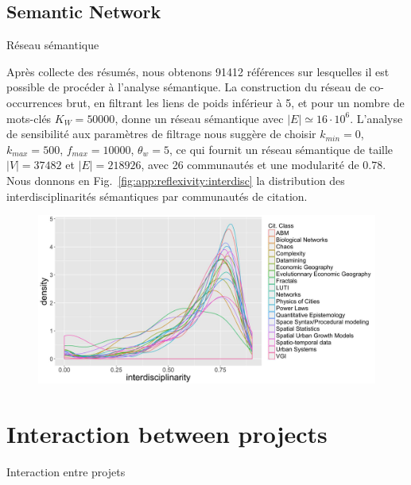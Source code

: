 \subsection{Semantic Network}{Réseau sémantique}


Après collecte des résumés, nous obtenons 91412 références sur lesquelles il est possible de procéder à l'analyse sémantique. La construction du réseau de co-occurrences brut, en filtrant les liens de poids inférieur à 5, et pour un nombre de mots-clés $K_W = 50000$, donne un réseau sémantique avec $\left|E\right|\simeq 16\cdot 10^6$. L'analyse de sensibilité aux paramètres de filtrage nous suggère de choisir $k_{min} = 0$, $k_{max}=500$, $f_{max} = 10000$, $\theta_w = 5$, ce qui fournit un réseau sémantique de taille $\left|V\right| = 37482$ et $\left|E\right| = 218926$, avec 26 communautés et une modularité de $0.78$. Nous donnons en Fig.~\ref{fig:app:reflexivity:interdisc} la distribution des interdisciplinarités sémantiques par communautés de citation.



\begin{figure}
	\includegraphics[width=\linewidth]{Figures/Final/F-reflexivity-interdisc.jpg}
\end{figure}








\section{Interaction between projects}{Interaction entre projets}


